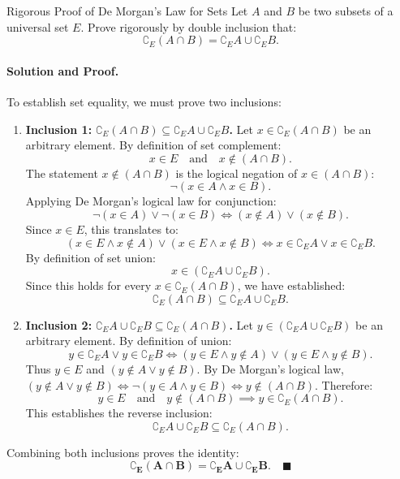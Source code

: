 \begin{workedexample}{Rigorous Proof of De Morgan's Law for Sets}
Let $A$ and $B$ be two subsets of a universal set $E$. Prove rigorously by double inclusion that:
\[
\complement_E (A \cap B) = \complement_E A \cup \complement_E B.
\]

\paragraph{Solution and Proof.}
To establish set equality, we must prove two inclusions:
\begin{enumerate}[leftmargin=1.4em,itemsep=3pt]
  \item \textbf{Inclusion 1: $\complement_E (A \cap B) \subseteq \complement_E A \cup \complement_E B$.}
  Let $x \in \complement_E (A \cap B)$ be an arbitrary element.
  By definition of set complement:
  \[
  x \in E \quad \text{and} \quad x \notin (A \cap B).
  \]
  The statement $x \notin (A \cap B)$ is the logical negation of $x \in (A \cap B)$:
  \[
  \neg (x \in A \land x \in B).
  \]
  Applying De Morgan's logical law for conjunction:
  \[
  \neg (x \in A) \lor \neg (x \in B) \iff (x \notin A) \lor (x \notin B).
  \]
  Since $x \in E$, this translates to:
  \[
  (x \in E \land x \notin A) \lor (x \in E \land x \notin B) \iff x \in \complement_E A \lor x \in \complement_E B.
  \]
  By definition of set union:
  \[
  x \in (\complement_E A \cup \complement_E B).
  \]
  Since this holds for every $x \in \complement_E (A \cap B)$, we have established:
  \[
  \complement_E (A \cap B) \subseteq \complement_E A \cup \complement_E B.
  \]

  \item \textbf{Inclusion 2: $\complement_E A \cup \complement_E B \subseteq \complement_E (A \cap B)$.}
  Let $y \in (\complement_E A \cup \complement_E B)$ be an arbitrary element.
  By definition of union:
  \[
  y \in \complement_E A \lor y \in \complement_E B \iff (y \in E \land y \notin A) \lor (y \in E \land y \notin B).
  \]
  Thus $y \in E$ and $(y \notin A \lor y \notin B)$.
  By De Morgan's logical law, $(y \notin A \lor y \notin B) \iff \neg(y \in A \land y \in B) \iff y \notin (A \cap B)$.
  Therefore:
  \[
  y \in E \quad \text{and} \quad y \notin (A \cap B) \implies y \in \complement_E (A \cap B).
  \]
  This establishes the reverse inclusion:
  \[
  \complement_E A \cup \complement_E B \subseteq \complement_E (A \cap B).
  \]
\end{enumerate}
Combining both inclusions proves the identity:
\[
\mathbf{\complement_E (A \cap B) = \complement_E A \cup \complement_E B}. \quad \blacksquare
\]
\end{workedexample}

